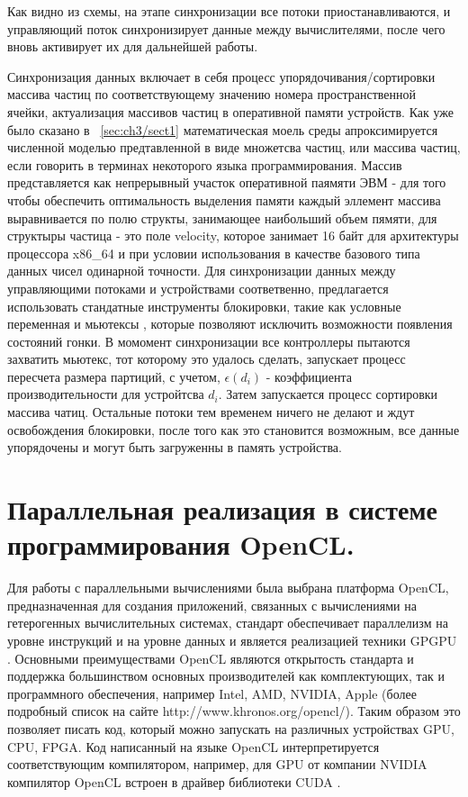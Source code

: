 Как видно из схемы, на этапе синхронизации все потоки  приостанавливаются, и управляющий поток синхронизирует данные между вычислителями, после чего вновь активирует их для дальнейшей работы.

Синхронизация данных включает в себя процесс упорядочивания/сортировки массива частиц по соответствующему значению номера пространственной ячейки, актуализация массивов частиц в оперативной памяти устройств. Как уже было сказано в ~\ref{sec:ch3/sect1} математическая моель среды апроксимируется численной моделью предтавленной в виде множетсва частиц, или массива частиц, если говорить в терминах некоторого языка программирования. Массив представляется как непрерывный участок оперативной паямяти ЭВМ - для того чтобы обеспечить оптимальность выделения памяти каждый эллемент массива выравнивается по полю структы, занимающее наибольший объем пямяти, для структыры частица - это поле velocity, которое занимает 16 байт для архитектуры процессора x86\_64 и при условии использования в качестве базового типа данных чисел одинарной точности. Для синхронизации данных между управляющими потоками и устройствами соответвенно, предлагается использовать стандатные инструменты блокировки, такие как условные переменная и мьютексы \cite{Dijkstra1965}, которые позволяют исключить возможности появления состояний гонки. В момомент синхронизации все контроллеры пытаются захватить мьютекс, тот  которому это удалось сделать, запускает процесс пересчета размера партиций, с учетом, \(\epsilon(d_{i})\) - коэффициента производительности для устройтсва \(d_i\). Затем запускается процесс сортировки массива чатиц. Остальные потоки тем временем ничего не делают и ждут освобождения блокировки, после того как это становится возможным, все данные упорядочены и могут быть загруженны в память устройства.

\section{Параллельная реализация в системе программирования OpenCL.}\label{sec:ch3/sect4}

Для работы с параллельными вычислениями была выбрана платформа OpenCL, предназначенная для создания приложений, связанных с вычислениями на гетерогенных вычислительных системах, стандарт обеспечивает параллелизм на уровне инструкций и на уровне  данных и является реализацией техники GPGPU  \cite{Munshi2011, Stone2010}. Основными  преимуществами OpenCL являются открытость стандарта и поддержка большинством основных производителей как комплектующих, так и программного обеспечения, например Intel, AMD, NVIDIA, Apple (более подробный список на сайте http://www.khronos.org/opencl/). Таким образом это позволяет писать код, который можно запускать на различных устройствах GPU, CPU, FPGA. Код написанный на языке OpenCL интерпретируется соответствующим  компилятором, например, для GPU от компании NVIDIA компилятор OpenCL встроен в драйвер библиотеки CUDA \cite{Cook2012}.

